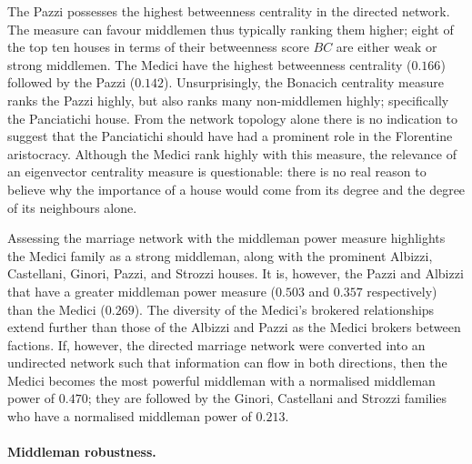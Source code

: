 The Pazzi possesses the highest betweenness centrality in the directed network. The measure can favour middlemen thus typically ranking them higher; eight of the top ten houses in terms of their betweenness score $BC$ are either weak or strong middlemen. The Medici have the highest betweenness centrality ($0.166$) followed by the Pazzi ($0.142$). Unsurprisingly, the Bonacich centrality measure ranks the Pazzi highly, but also ranks many non-middlemen highly; specifically the Panciatichi house. From the network topology alone there is no indication to suggest that the Panciatichi should have had a prominent role in the Florentine aristocracy. Although the Medici rank highly with this measure, the relevance of an eigenvector centrality measure is questionable: there is no real reason to believe why the importance of a house would come from its degree and the degree of its neighbours alone.

Assessing the marriage network with the middleman power measure highlights the Medici family as a strong middleman, along with the prominent Albizzi, Castellani, Ginori, Pazzi, and Strozzi houses. It is, however, the Pazzi and Albizzi that have a greater middleman power measure ($0.503$ and $0.357$ respectively) than the Medici ($0.269$). The diversity of the Medici's brokered relationships extend further than those of the Albizzi and Pazzi as the Medici brokers between factions. If, however, the directed marriage network were converted into an undirected network such that information can flow in both directions, then the Medici becomes the most powerful middleman with a normalised middleman power of $0.470$; they are followed by the Ginori, Castellani and Strozzi families who have a normalised middleman power of $0.213$.


\paragraph{Middleman robustness.}

